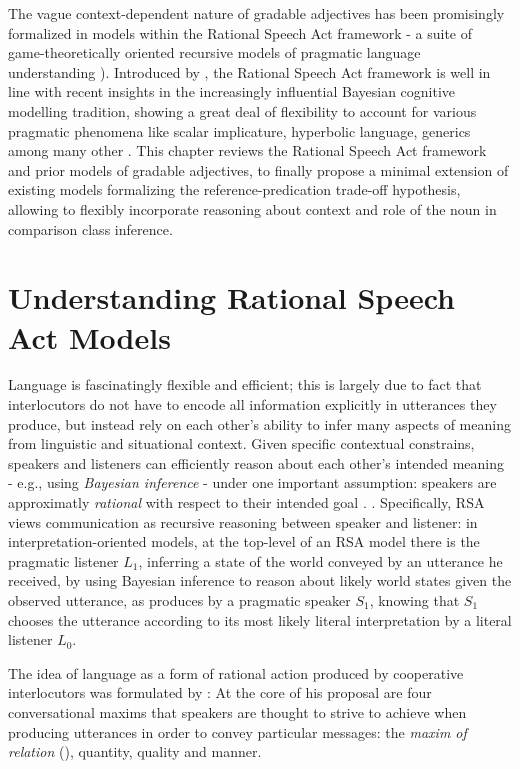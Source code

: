 The vague context-dependent nature of gradable adjectives has been promisingly formalized in models within the Rational Speech Act framework -  a suite of game-theoretically oriented recursive models of pragmatic language understanding \parencite{goodman2016, lassiter2017adjectival, tessler2017warm}). Introduced by \textcite{frank2012predicting}, the Rational Speech Act framework is well in line with recent insights in the increasingly influential Bayesian cognitive modelling tradition, showing a great deal of flexibility to account for various pragmatic phenomena like scalar implicature, hyperbolic language, generics among many other \parencite[e.g.,][]{tenenbaum2011grow, problang}. This chapter reviews the Rational Speech Act framework and prior models of gradable adjectives, to finally propose a minimal extension of existing models formalizing the reference-predication trade-off hypothesis, allowing to flexibly incorporate reasoning about context and role of the noun in comparison class inference. 
  
\section{Understanding Rational Speech Act Models}

Language is fascinatingly flexible and efficient; this is largely due to fact that interlocutors do not have to encode all information explicitly in utterances they produce, but instead rely on each other's ability to infer many aspects of meaning from linguistic and situational context. Given specific contextual constrains, speakers and listeners can efficiently reason about each other's intended meaning - e.g., using \emph{Bayesian inference} - under one important assumption: speakers are approximatly \emph{rational} with respect to their intended goal \parencite{frank2012predicting}. . Specifically, RSA views communication as recursive reasoning between speaker and listener: in interpretation-oriented models, at the top-level of an RSA model there is the pragmatic listener $L_1$, inferring a state of the world conveyed by an utterance he received, by using Bayesian inference to reason about likely world states given the observed utterance, as produces by a pragmatic speaker $S_1$, knowing that $S_1$ chooses the utterance according to its most likely literal interpretation by a literal listener $L_0$.  

The idea of language as a form of rational action produced by cooperative interlocutors was formulated by \textcite{grice1975logic}: At the core of his proposal are four conversational maxims that speakers are thought to strive to achieve when producing utterances in order to convey particular messages: the \emph{maxim of relation} (), quantity, quality and manner. 

